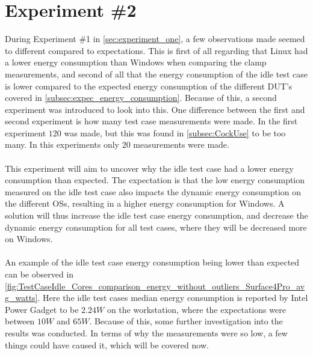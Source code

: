 \section{Experiment \#2}\label{sec:experiment_two}

During Experiment \#1 in \cref{sec:experiment_one}, a few observations made seemed to different compared to expectations. This is first of all regarding that Linux had a lower energy consumption than Windows when comparing the clamp measurements, and second of all that the energy consumption of the idle test case is lower compared to the expected energy consumption of the different DUT's covered in \cref{subsec:expec_energy_consumption}. Because of this, a second experiment was introduced to look into this. One difference between the first and second experiment is how many test case measurements were made. In the first experiment $120$ was made, but this was found in \cref*{subsec:CockUse} to be too many. In this experiments only $20$ measurements were made. 

\paragraph*{}
This experiment will aim to uncover why the idle test case had a lower energy consumption than expected. The expectation is that the low energy consumption measured on the idle test case also impacts the dynamic energy consumption on the different OSs, resulting in a higher energy consumption for Windows. A solution will thus increase the idle test case energy consumption, and decrease the dynamic energy consumption for all test cases, where they will be decreased more on Windows. 

\paragraph*{}
An example of the idle test case energy consumption being lower than expected can be observed in \cref{fig:TestCaseIdle_Cores_comparison_energy_without_outliers_Surface4Pro_avg_watts}. Here the idle test cases median energy consumption is reported by Intel Power Gadget to be $2.24W$ on the workstation, where the expectations were between $10W$ and $65W$. Because of this, some further investigation into the results was conducted. In terms of why the measurements were so low, a few things could have caused it, which will be covered now.



